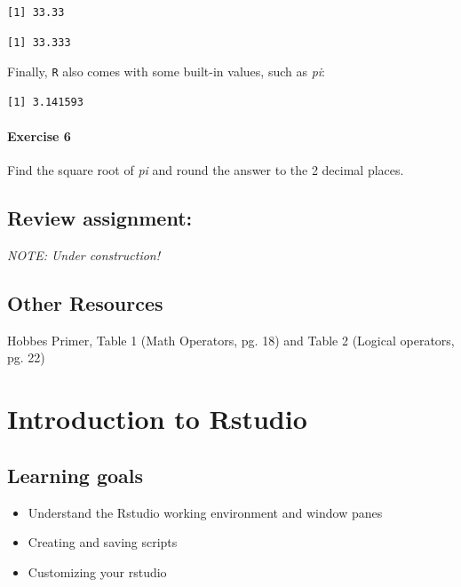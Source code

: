 \documentclass[
]{book}
\providecommand{\tightlist}{%
  \setlength{\itemsep}{0pt}\setlength{\parskip}{0pt}}
\begin{document}
\begin{verbatim}
[1] 33.33
\end{verbatim}

\begin{verbatim}
[1] 33.333
\end{verbatim}

Finally, \texttt{R} also comes with some built-in values, such as \emph{pi}:

\begin{verbatim}
[1] 3.141593
\end{verbatim}

\hypertarget{exercise-6}{%
\subsubsection*{Exercise 6}\label{exercise-6}}

Find the square root of \emph{pi} and round the answer to the 2 decimal places.

\hypertarget{review-assignment}{%
\section*{Review assignment:}\label{review-assignment}}

\emph{NOTE: Under construction!}

\hypertarget{other-resources}{%
\section{Other Resources}\label{other-resources}}

Hobbes Primer, Table 1 (Math Operators, pg. 18) and Table 2 (Logical operators, pg. 22)

\hypertarget{introduction-to-rstudio}{%
\chapter{Introduction to Rstudio}\label{introduction-to-rstudio}}

\hypertarget{learning-goals-1}{%
\section*{Learning goals}\label{learning-goals-1}}

\begin{itemize}
\tightlist
\item
  Understand the Rstudio working environment and window panes\\
\item
  Creating and saving scripts
\item
  Customizing your rstudio
\end{itemize}
\end{document}
